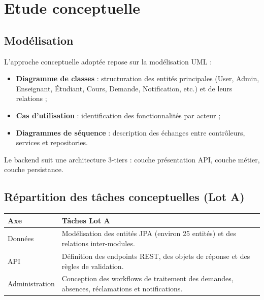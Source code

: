 \chapter{Etude conceptuelle}

\section*{Modélisation}
L'approche conceptuelle adoptée repose sur la modélisation UML :
\begin{itemize}
	\item \textbf{Diagramme de classes} : structuration des entités principales (User, Admin, Enseignant, Étudiant, Cours, Demande, Notification, etc.) et de leurs relations ;
	\item \textbf{Cas d'utilisation} : identification des fonctionnalités par acteur ;
	\item \textbf{Diagrammes de séquence} : description des échanges entre contrôleurs, services et repositories.
\end{itemize}

Le backend suit une architecture 3-tiers : couche présentation API, couche métier, couche persistance.

\section*{Répartition des tâches conceptuelles (Lot A)}
\begin{tabularx}{\textwidth}{lX}
\toprule
\textbf{Axe} & \textbf{Tâches Lot A} \\
\midrule
Données & Modélisation des entités JPA (environ 25 entités) et des relations inter-modules. \\
API & Définition des endpoints REST, des objets de réponse et des règles de validation. \\
Administration & Conception des workflows de traitement des demandes, absences, réclamations et notifications. \\
\bottomrule
\end{tabularx}
